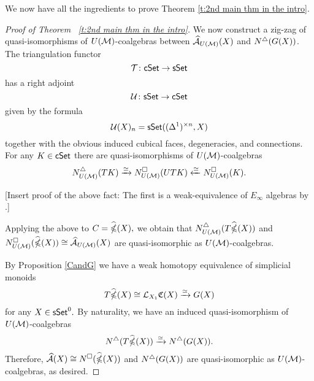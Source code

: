 We now have all the ingredients to prove Theorem \ref{t:2nd main thm in the intro}.
\begin{proof}[Proof of Theorem ~\ref{t:2nd main thm in the intro}]

We now construct a zig-zag of quasi-isomorphisms of $U(\mathcal{M})$-coalgebras between $\widehat{\mathcal{A}}_{U(\mathcal{M})}(X)$ and $N^{\triangle} (G(X))$.
The triangulation functor $$\mathcal{T}\colon \mathsf{cSet} \to \mathsf{sSet}$$
has a right adjoint $$\mathcal{U}\colon \mathsf{sSet} \to \mathsf{cSet}$$
given by the formula
$$\mathcal{U}(X)_n= \mathsf{sSet}((\Delta^1)^{\times n}, X)$$
together with the obvious induced cubical faces, degeneracies, and connections. For any $K \in \mathsf{cSet}$ there are quasi-isomorphisms of $U(\mathcal{M})$-coalgebras
$$N^{\triangle}_{U(\mathcal{M})}(TK) \xrightarrow{\simeq} N^{\square}_{U(\mathcal{M})}(UTK) \xleftarrow{\simeq} N^{\square}_{U(\mathcal{M})}(K).$$

[Insert proof of the above fact: The first is a weak-equivalence of $E_\infty$ algebras by \cite{medina2021cubical}.]

Applying the above to $C= \widehat{\mathbb{\Omega}}(X),$ we obtain that $N^{\triangle}_{U(\mathcal{M})}(T\widehat{\mathbb{\Omega}}(X))$ and $N^{\square}_{U(\mathcal{M})}(\widehat{\mathbb{\Omega}}(X)) \cong \widehat{\mathcal{A}}_{U(\mathcal{M})}(X)$ are quasi-isomorphic as $U(\mathcal{M})$-coalgebras. 

By Proposition \ref{CandG} we have a weak homotopy equivalence of simplicial monoids
$$T\widehat{\mathbb{\Omega}}(X) \cong \mathcal{L}_{X_1}\mathfrak{C}(X) \xrightarrow{\simeq} G(X)$$ for any $X \in \mathsf{sSet}^0.$ By naturality, we have an induced quasi-isomorphism of $U(\mathcal{M})$-coalgebras
$$N^{\triangle}(T\widehat{\mathbb{\Omega}}(X)) \xrightarrow{\simeq} N^{\triangle}(G(X)).$$
Therefore, $\widehat{\mathcal{A}}(X) \cong N^{\square}(\widehat{\mathbb{\Omega}}(X))$ and $N^{\triangle}(G(X))$ are quasi-isomorphic as $U(\mathcal{M})$-coalgebras, as desired. 




\end{proof}